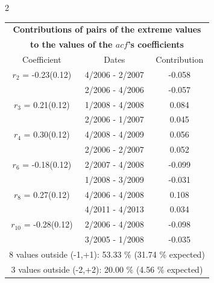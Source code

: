 
\thispagestyle{empty}
\begin{multicols}{2}{ 
\begin{tabular}{ccc}
\multicolumn{3}{c}{\textbf{Contributions of pairs of the extreme values} }  \vspace{-.10in}  \\ 
\multicolumn{3}{c}{ \textbf{to the values of the $acf$'s coefficients}} \\ 
\hline 
\hline                  Coefficient  &  Dates &  Contribution \\ 
\hline 
  $r_{ 2}$ = -0.23(0.12) &       4/2006 -  2/2007 &       -0.058    \vspace{-.10in} \\ 
  &        2/2006 -  4/2006 &       -0.057  \vspace{-.02in}   \\ \hline 
    $r_{ 3}$ = 0.21(0.12) &       1/2008 -  4/2008 &        0.084   \vspace{-.10in} \\  
&        2/2006 -  1/2007 &        0.045  \vspace{-.02in} \\ \hline 
  $r_{ 4}$ = 0.30(0.12) &       4/2008 -  4/2009 &        0.056   \vspace{-.10in} \\  
&        2/2006 -  2/2007 &        0.052  \vspace{-.02in} \\ \hline 
  $r_{ 6}$ = -0.18(0.12) &       2/2007 -  4/2008 &       -0.099    \vspace{-.10in} \\ 
  &        1/2008 -  3/2009 &       -0.031  \vspace{-.02in}   \\ \hline 
    $r_{ 8}$ = 0.27(0.12) &       4/2006 -  4/2008 &        0.108   \vspace{-.10in} \\  
&        4/2011 -  4/2013 &        0.034  \vspace{-.02in} \\ \hline 
  $r_{10}$ = -0.28(0.12) &       2/2006 -  4/2008 &       -0.098    \vspace{-.10in} \\ 
  &        3/2005 -  1/2008 &       -0.035  \vspace{-.02in}   \\ \hline 
  \multicolumn{3}{c}{               8 values outside (-1,+1): 53.33  \% (31.74  \% expected)}\vspace{-.10in} \\ 
\multicolumn{3}{c}{               3 values outside (-2,+2): 20.00 \%  (4.56 \% expected) } \\
 \end{tabular} \\ 
 } 
\end{multicols} 
